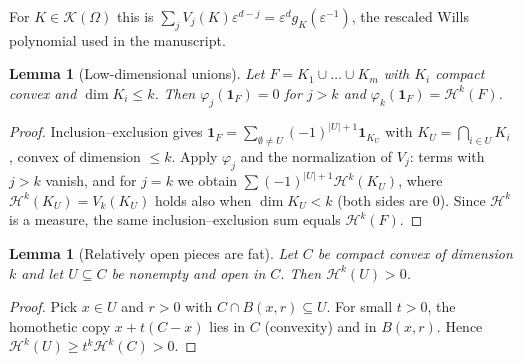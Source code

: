 \documentclass[11pt]{article}
\newtheorem{lemma}[theorem]{Lemma}
\theoremstyle{definition}
\theoremstyle{remark}
\newcommand{\eps}{\varepsilon}
\newcommand{\KK}{\mathcal K}
\newcommand{\Hk}{\mathcal H}
\begin{document}
For $K\in\KK(\Omega)$ this is $\sum_jV_j(K)\eps^{d-j}=\eps^dg_K(\eps^{-1})$,
the rescaled Wills polynomial used in the manuscript.

\begin{lemma}[Low-dimensional unions]\label{lem:lowdim}
Let $F=K_1\cup\dots\cup K_m$ with $K_i$ compact convex and
$\dim K_i\leq k$. Then $\varphi_j(\mathbf 1_F)=0$ for $j>k$ and
$\varphi_k(\mathbf 1_F)=\Hk^k(F)$.
\end{lemma}
\begin{proof}
Inclusion--exclusion gives
$\mathbf 1_F=\sum_{\emptyset\neq U}(-1)^{|U|+1}\mathbf 1_{K_U}$ with
$K_U=\bigcap_{i\in U}K_i$, convex of dimension $\leq k$. Apply
$\varphi_j$ and the normalization of $V_j$: terms with $j>k$ vanish, and
for $j=k$ we obtain $\sum(-1)^{|U|+1}\Hk^k(K_U)$, where $\Hk^k(K_U)=V_k(K_U)$
holds also when $\dim K_U<k$ (both sides are $0$). Since $\Hk^k$ is a
measure, the same inclusion--exclusion sum equals $\Hk^k(F)$.
\end{proof}

\begin{lemma}[Relatively open pieces are fat]\label{lem:fat}
Let $C$ be compact convex of dimension $k$ and let $U\subseteq C$ be
nonempty and open in $C$. Then $\Hk^k(U)>0$.
\end{lemma}
\begin{proof}
Pick $x\in U$ and $r>0$ with $C\cap B(x,r)\subseteq U$. For small $t>0$,
the homothetic copy $x+t(C-x)$ lies in $C$ (convexity) and in $B(x,r)$.
Hence $\Hk^k(U)\geq t^k\Hk^k(C)>0$.
\end{proof}
\end{document}
